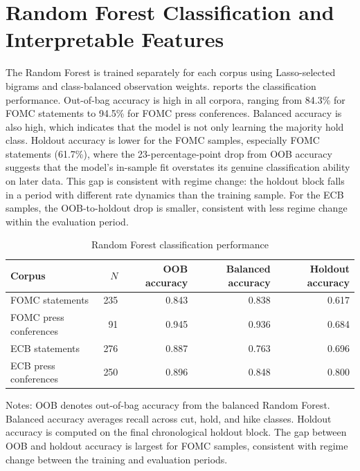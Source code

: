\section{Random Forest Classification and Interpretable Features}
\label{sec:res_rf_new}

The Random Forest is trained separately for each corpus using Lasso-selected
bigrams and class-balanced observation weights.  reports
the classification performance. Out-of-bag accuracy is high in all corpora,
ranging from 84.3\% for FOMC statements to 94.5\% for FOMC press conferences.
Balanced accuracy is also high, which indicates that the model is not only
learning the majority hold class. Holdout accuracy is lower for the FOMC
samples, especially FOMC statements (61.7\%), where the 23-percentage-point
drop from OOB accuracy suggests that the model's in-sample fit overstates its
genuine classification ability on later data. This gap is consistent with
regime change: the holdout block falls in a period with different rate dynamics
than the training sample. For the ECB samples, the OOB-to-holdout drop is
smaller, consistent with less regime change within the evaluation period.

\begin{table}[H]
\centering
\caption{Random Forest classification performance}
\label{tab:rf_perf_v31}
\begin{threeparttable}
\small
\begin{tabular}{lrrrr}
\toprule
Corpus & $N$ & OOB accuracy & Balanced accuracy & Holdout accuracy \\
\midrule
FOMC statements & 235 & 0.843 & 0.838 & 0.617 \\
FOMC press conferences & 91 & 0.945 & 0.936 & 0.684 \\
ECB statements & 276 & 0.887 & 0.763 & 0.696 \\
ECB press conferences & 250 & 0.896 & 0.848 & 0.800 \\
\bottomrule
\end{tabular}
\begin{tablenotes}
\footnotesize
\item Notes: OOB denotes out-of-bag accuracy from the balanced Random Forest. Balanced accuracy averages recall across cut, hold, and hike classes. Holdout accuracy is computed on the final chronological holdout block. The gap between OOB and holdout accuracy is largest for FOMC samples, consistent with regime change between the training and evaluation periods.
\end{tablenotes}
\end{threeparttable}
\end{table}

